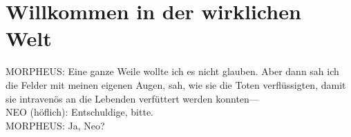 \section{Willkommen in der wirklichen Welt\protect\footnotemark}
\begin{playdialog}
MORPHEUS: Eine ganze Weile wollte ich es nicht glauben. Aber dann sah ich die Felder mit meinen eigenen Augen, sah, wie sie die Toten verflüssigten, damit sie intravenös an die Lebenden verfüttert werden konnten—\\

NEO (höflich): Entschuldige, bitte.\\

MORPHEUS: Ja, Neo?\\


\end{playdialog}

